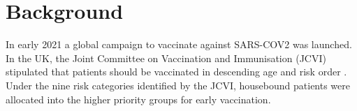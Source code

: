 \documentclass[review]{elsarticle}
\def\vm{VaxiMap}
\begin{document}
%
%
%

\section{Background}
\label{sec:background}

In early 2021 a global campaign to vaccinate against SARS-COV2 was launched. In the UK, the Joint Committee on Vaccination and Immunisation (JCVI) stipulated that patients should be vaccinated in descending age and risk order \cite{JCVI2020}. Under the nine risk categories identified by the JCVI, housebound patients were allocated into the higher priority groups for early vaccination. 
\end{document}
